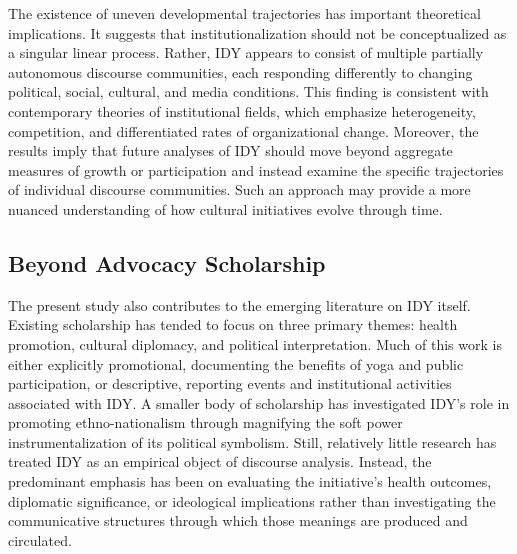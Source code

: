 \documentclass[11pt]{article}
\begin{document}
The existence of uneven developmental trajectories has important theoretical implications. It suggests that institutionalization should not be conceptualized as a singular linear process. Rather, IDY appears to consist of multiple partially autonomous discourse communities, each responding differently to changing political, social, cultural, and media conditions. This finding is consistent with contemporary theories of institutional fields, which emphasize heterogeneity, competition, and differentiated rates of organizational change. Moreover, the results imply that future analyses of IDY should move beyond aggregate measures of growth or participation and instead examine the specific trajectories of individual discourse communities. Such an approach may provide a more nuanced understanding of how cultural initiatives evolve through time.


\subsection{Beyond Advocacy Scholarship}

The present study also contributes to the emerging literature on IDY itself. Existing scholarship has tended to focus on three primary themes: health promotion, cultural diplomacy, and political interpretation. Much of this work is either explicitly promotional, documenting the benefits of yoga and public participation, or descriptive, reporting events and institutional activities associated with IDY. A smaller body of scholarship has investigated IDY's role in promoting ethno-nationalism through magnifying the soft power instrumentalization of its political symbolism. Still, relatively little research has treated IDY as an empirical object of discourse analysis. Instead, the predominant emphasis has been on evaluating the initiative's health outcomes, diplomatic significance, or ideological implications rather than investigating the communicative structures through which those meanings are produced and circulated.
\end{document}
